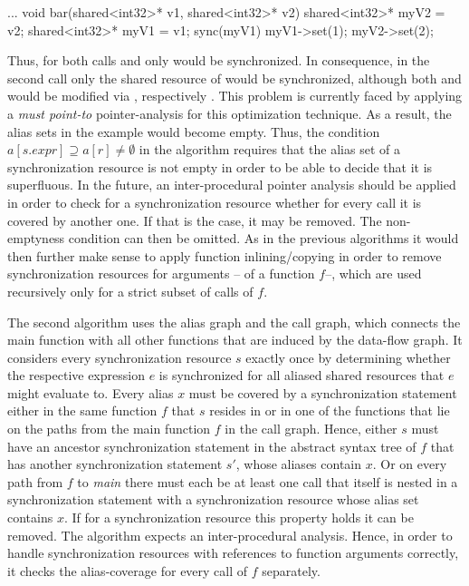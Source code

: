 \begin{ccode}
...
void bar(shared<int32>* v1, shared<int32>* v2) { 
  shared<int32>* myV2 = v2; 
  shared<int32>* myV1 = v1;
  sync(myV1) { 
    myV1->set(1); 
    myV2->set(2); 
  } 
}
\end{ccode}
Thus, for both calls  and  only  would be synchronized. In consequence, in the second call only the shared resource of  would be synchronized, although both  and  would be modified via , respectively . This problem is currently faced by applying a \textit{must point-to} pointer-analysis for this optimization technique. As a result, the alias sets in the example would become empty. Thus, the condition $a[s.\mathit{expr}] \supseteq a[r] \neq \emptyset$ in the algorithm requires that the alias set of a synchronization resource is not empty in order to be able to decide that it is superfluous. In the future, an inter-procedural pointer analysis should be applied in order to check for a synchronization resource whether for every call it is covered by another one. If that is the case, it may be removed. The non-emptyness condition can then be omitted. As in the previous algorithms it would then further make sense to apply function inlining/copying in order to remove synchronization resources for arguments -- of a function $f$--, which are used recursively only for a strict subset of calls of $f$.

The second algorithm uses the alias graph and the call graph, which connects the main function with all other functions that are induced by the data-flow graph. It considers every synchronization resource $s$ exactly once by determining whether the respective expression $e$ is synchronized for all aliased shared resources that $e$ might evaluate to. Every alias $x$ must  be covered by a synchronization statement either in the same function $f$ that $s$ resides in or in one of the functions that lie on the paths from the main function $f$ in the call graph. Hence, either $s$ must have an ancestor synchronization statement in the abstract syntax tree of $f$ that has another synchronization statement $s'$, whose aliases contain $x$. Or on every path from $f$ to \textit{main} there must each be at least one call that itself is nested in a synchronization statement with a synchronization resource whose alias set contains $x$. If for a synchronization resource this property holds it can be removed. The algorithm expects an inter-procedural analysis. Hence, in order to handle synchronization resources with references to function arguments correctly, it checks the alias-coverage for every call of $f$ separately.

